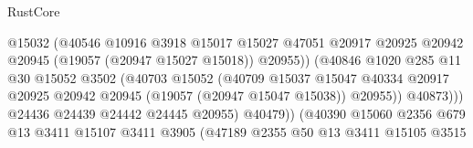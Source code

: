 \begin{lexlean}{RustCore}
\begin{coremodule}
                                          @15032
                                          (@40546
                                            @10916
                                            @3918
                                            @15017
                                            @15027
                                            @47051
                                            @20917
                                            @20925
                                            @20942
                                            @20945
                                            (@19057 (@20947 @15027 @15018))
                                            @20955))
                                        (@40846
                                          @1020
                                          @285
                                          @11
                                          @30
                                          @15052
                                          @3502
                                          (@40703
                                            @15052
                                            (@40709
                                              @15037
                                              @15047
                                              @40334
                                              @20917
                                              @20925
                                              @20942
                                              @20945
                                              (@19057 (@20947 @15047 @15038))
                                              @20955))
                                          @40873)))
                                    @24436
                                    @24439
                                    @24442
                                    @24445
                                    @20955)
                                  @40479))
                              (@40390
                                @15060
                                @2356
                                @679
                                @13
                                @3411
                                @15107
                                @3411
                                @3905
                                (@47189
                                  @2355
                                  @50
                                  @13
                                  @3411
                                  @15105
                                  @3515

\end{coremodule}
\end{lexlean}
